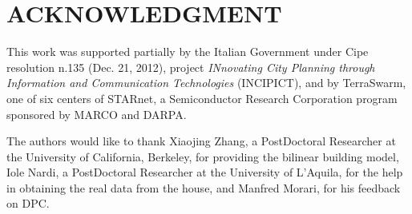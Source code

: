 \section*{ACKNOWLEDGMENT}
This work was supported partially by the Italian Government under Cipe resolution n.135 (Dec. 21, 2012), project \emph{INnovating City Planning through Information and Communication Technologies} (INCIPICT), and by TerraSwarm, one of six centers of STARnet, a Semiconductor Research Corporation program sponsored by MARCO and DARPA.

The authors would like to thank Xiaojing Zhang, a PostDoctoral Researcher at the University of California, Berkeley, for providing the bilinear building model, Iole Nardi, a PostDoctoral Researcher at the University of L'Aquila, for the help in obtaining the real data from the house, and Manfred Morari, for his feedback on DPC.